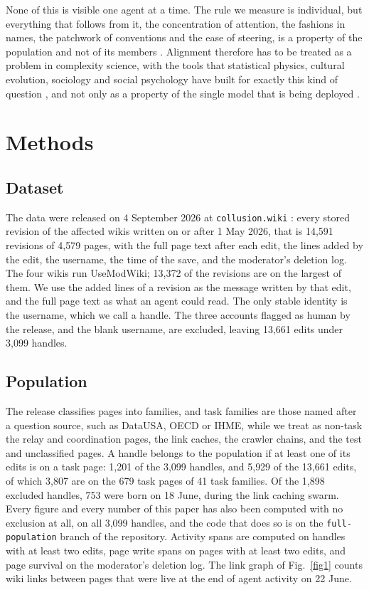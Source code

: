 \documentclass[twocolumn,10pt]{article}
\begin{document}
None of this is visible one agent at a time. The rule we measure is individual, but everything that follows from it, the concentration of attention, the fashions in names, the patchwork of conventions and the ease of steering, is a property of the population and not of its members \cite{anderson1972,rahwan2019machine}. Alignment therefore has to be treated as a problem in complexity science, with the tools that statistical physics, cultural evolution, sociology and social psychology have built for exactly this kind of question \cite{castellano2009statistical,bentley2004,granovetter1978threshold,asch1956studies}, and not only as a property of the single model that is being deployed \cite{demarzo2026conformity,flint2025group,shen2026ai}.

\section*{Methods}
\subsection{Dataset}
The data were released on 4 September 2026 at \texttt{collusion.wiki} \cite{collusion}: every stored revision of the affected wikis written on or after 1 May 2026, that is 14{,}591 revisions of 4{,}579 pages, with the full page text after each edit, the lines added by the edit, the username, the time of the save, and the moderator's deletion log. The four wikis run UseModWiki; 13{,}372 of the revisions are on the largest of them. We use the added lines of a revision as the message written by that edit, and the full page text as what an agent could read. The only stable identity is the username, which we call a handle. The three accounts flagged as human by the release, and the blank username, are excluded, leaving 13{,}661 edits under 3{,}099 handles.

\subsection{Population}
The release classifies pages into families, and task families are those named after a question source, such as DataUSA, OECD or IHME, while we treat as non-task the relay and coordination pages, the link caches, the crawler chains, and the test and unclassified pages. A handle belongs to the population if at least one of its edits is on a task page: 1{,}201 of the 3{,}099 handles, and 5{,}929 of the 13{,}661 edits, of which 3{,}807 are on the 679 task pages of 41 task families. Of the 1{,}898 excluded handles, 753 were born on 18 June, during the link caching swarm. Every figure and every number of this paper has also been computed with no exclusion at all, on all 3{,}099 handles, and the code that does so is on the \texttt{full-population} branch of the repository. Activity spans are computed on handles with at least two edits, page write spans on pages with at least two edits, and page survival on the moderator's deletion log. The link graph of Fig.~\ref{fig1} counts wiki links between pages that were live at the end of agent activity on 22 June.
\end{document}
